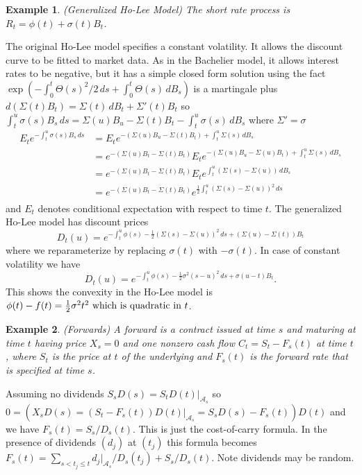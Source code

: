 \documentclass[fleqn]{amsart}
\renewcommand{\AA}{\mathcal{A}}
\newtheorem{example}{Example}
\begin{document}
\begin{example}{(Generalized Ho-Lee Model\cite{HoLee1986})}
The short rate process is \(R_t = \phi(t) + \sigma(t)B_t\).
\end{example}
The original Ho-Lee model specifies a constant volatility. It
allows the discount curve to be fitted to market
data. As in the Bachelier model, it allows interest rates to
be negative, but it has a simple closed form solution
using the fact \(\exp(-\int_0^t \Theta(s)^2/2\,ds + \int_0^t \Theta(s)\,dB_s)\)
is a martingale plus \(d(\Sigma(t)B_t) = \Sigma(t)\,dB_t + \Sigma'(t) B_t\)
so \(\int_t^u \sigma(s)B_s\,ds 
= \Sigma(u)B_u - \Sigma(t)B_t - \int_t^u \sigma(s)\,dB_s\)
where \(\Sigma' = \sigma\)
\begin{align*}
E_t e^{-\int_t^u \sigma(s)B_s\,ds}
&= E_t e^{-(\Sigma(u)B_u - \Sigma(t)B_t) + \int_t^u \Sigma(s)\,dB_s }\\
&= e^{-(\Sigma(u)B_t - \Sigma(t)B_t)} E_t e^{-(\Sigma(u)B_u - \Sigma(u)B_t) + \int_t^u \Sigma(s)\,dB_s }\\
&= e^{-(\Sigma(u)B_t - \Sigma(t)B_t)} E_t e^{\int_t^u (\Sigma(s) - \Sigma(u))\,dB_s }\\
&= e^{-(\Sigma(u)B_t - \Sigma(t)B_t)} e^{\frac{1}{2}\int_t^u (\Sigma(s) - \Sigma(u))^2\,ds }\\
\end{align*}
and \(E_t\) denotes conditional expectation with respect to time \(t\).
The generalized Ho-Lee model has discount prices
\[
D_t(u) = e^{-\int_t^u \phi(s) - \frac{1}{2}(\Sigma(s) - \Sigma(u))^2\,ds + (\Sigma(u) - \Sigma(t))B_t}
\]
where we reparameterize by replacing \(\sigma(t)\) with \(-\sigma(t)\).
In case of constant volatility we have
\[
D_t(u) = e^{-\int_t^u \phi(s) - \frac{1}{2}\sigma^2(s - u)^2\,ds + \sigma(u - t)B_t}.
\]
This shows the convexity in the Ho-Lee model is \(\phi(t) - f(t) = \frac{1}{2}\sigma^2t^2$
which is quadratic in \(t\).

\begin{example}{(Forwards)}
A forward is a contract issued at time $s$ and maturing at time $t$
having price $X_s = 0$ and one nonzero cash flow
$C_t = S_t - F_s(t)$ at time $t$, where $S_t$ is the price
at $t$ of the underlying and $F_s(t)$ is the forward rate that
is specified at time $s$.
\end{example}
Assuming no dividends \(S_sD(s) = S_tD(t)|_{\AA_s}\) so
\(0 = (X_sD(s) = (S_t - F_s(t))D(t)|_{\AA_s} = S_sD(s) - F_s(t))D(t)\) and
we have \(F_s(t) = S_s/D_s(t)\). This is just the cost-of-carry
formula. In the presence of dividends \((d_j)\) at \((t_j)\)
this formula becomes 
\(F_s(t) = \sum_{s < t_j \le t} d_j|_{\AA_s}/D_s(t_j) + S_s/D_s(t)\).
Note dividends may be random.
\end{document}

